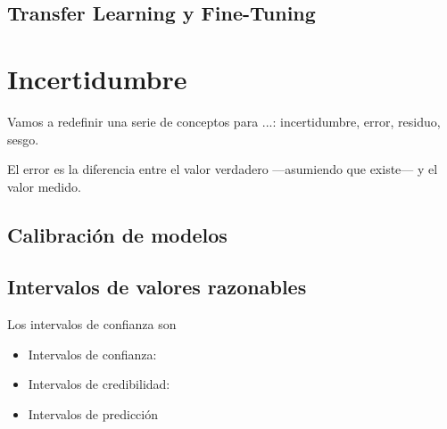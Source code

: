 

\subsection{Transfer Learning y Fine-Tuning}





\section{Incertidumbre}


Vamos a redefinir una serie de conceptos para ...: incertidumbre, error, residuo, sesgo.

El error es la diferencia entre el valor verdadero ---asumiendo que existe--- y el valor medido.





\subsection{Calibración de modelos}




\subsection{Intervalos de valores razonables}


Los intervalos de confianza son 

\begin{itemize}
    \item Intervalos de confianza:
    \item Intervalos de credibilidad: 
    \item Intervalos de predicción
\end{itemize}




